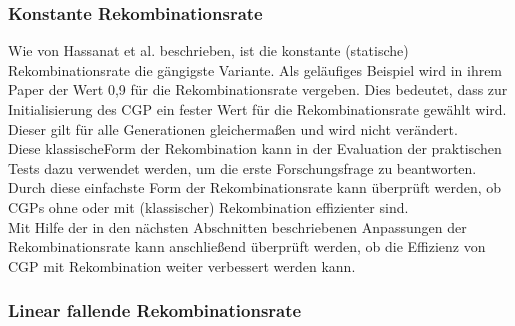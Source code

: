 \subsubsection{Konstante Rekombinationsrate}
\label{subsubsec:konstanteCrossover}

Wie von Hassanat et al. beschrieben, ist die konstante (statische) Rekombinationsrate die gängigste Variante. 
Als geläufiges Beispiel wird in ihrem Paper der Wert 0,9 für die Rekombinationsrate vergeben. \cite{hassanat_choosing_2019} 
Dies bedeutet, dass zur Initialisierung des CGP ein fester Wert für die Rekombinationsrate gewählt wird.
Dieser gilt für alle Generationen gleichermaßen und wird nicht verändert.\\
Diese \glqq klassische\grqq\space Form der Rekombination kann in der Evaluation der praktischen Tests dazu verwendet werden, um die erste Forschungsfrage zu beantworten.
Durch diese einfachste Form der Rekombinationsrate kann überprüft werden, ob CGPs ohne oder mit (klassischer) Rekombination effizienter sind.\\
Mit Hilfe der in den nächsten Abschnitten beschriebenen Anpassungen der Rekombinationsrate kann anschließend überprüft werden, ob die Effizienz von CGP mit Rekombination weiter verbessert werden kann.

\subsubsection{Linear fallende Rekombinationsrate}
\label{subsubsec:CleggCrossover}

